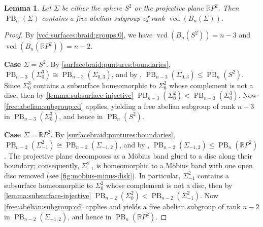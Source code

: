 \documentclass[a4paper,12pt,leqno]{amsart}
\newtheorem{lemma}[theorem]{Lemma}
\theoremstyle{definition}
\DeclareMathOperator{\vcd}{vcd}
\DeclareMathOperator{\pb}{PB}
\begin{document}
\begin{lemma}\label{free:abelian:subgroup:sphere}
Let $\Sigma$ be either the sphere $S^2$ or the projective plane $\mathbb{R}P^2$.
Then $\pb_n(\Sigma)$ contains a free abelian subgroup of rank $\vcd(B_n(\Sigma))$.
\end{lemma}
\begin{proof}
By \cref{vcd:surfaces:braid:groups:0}, we have $\vcd(B_n(S^2)) = n-3$ and
$\vcd(B_n(\mathbb{R}P^2)) = n-2$.

\textbf{Case $\Sigma = S^2$.}
By \cref{surfacebraid:puntures:boundaries}, $\pb_{n-3}(\Sigma_0^3) \cong \pb_{n-3}(\Sigma_{0,3})$,
and by \cite[Remark~8]{MR3382024}, $\pb_{n-3}(\Sigma_{0,3}) \leq \pb_n(S^2)$.
Since $\Sigma_{0}^3$ contains a subsurface homeomorphic to $\Sigma_{0}^2$ whose complement
is not a disc, then by \cref{lemma:subsurface-injective} $\pb_{n-3}(\Sigma_{0}^2)<\pb_{n-3}(\Sigma_{0}^3)$. Now \cref{free:abelian:subgroup:cd} applies, yielding a free abelian subgroup
of rank $n-3$ in $\pb_{n-3}(\Sigma_{0}^3)$, and hence in $\pb_n(S^2)$.

\textbf{Case $\Sigma = \mathbb{R}P^2$.}
By \cref{surfacebraid:puntures:boundaries}, $\pb_{n-2}(\Sigma_{-1}^2) \cong
\pb_{n-2}(\Sigma_{-1,2})$, and by \cite[Remark~8]{MR3382024},
$\pb_{n-2}(\Sigma_{-1,2}) \leq \pb_n(\mathbb{R}P^2)$.
The projective plane decomposes as a Möbius band glued to a disc along their boundary;
consequently, $\Sigma_{-1}^2$ is homeomorphic to a Möbius band with one open disc removed
(see \cref{fig:mobius-minus-disk}).
In particular, $\Sigma_{-1}^2$ contains a subsurface homeomorphic to $\Sigma_{0}^2$ whose
complement is not a disc, then by \cref{lemma:subsurface-injective} $\pb_{n-2}(\Sigma_{0}^2) <\pb_{n-2}(\Sigma_{-1}^2)$. Now \cref{free:abelian:subgroup:cd} applies and yields a free abelian
subgroup of rank $n-2$ in $\pb_{n-2}(\Sigma_{-1,2})$, and hence in $\pb_n(\mathbb{R}P^2)$.
\end{proof}
\end{document}
